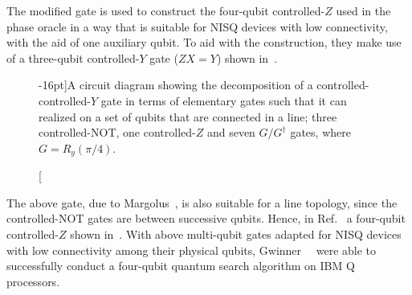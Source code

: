 \noindent
The modified gate is used to construct the four-qubit controlled-$Z$ used in the phase oracle in a way that is suitable for \acs{NISQ} devices with low connectivity, with the aid of one auxiliary qubit. To aid with the construction, they make use of a three-qubit controlled-$Y$ gate ($ZX = Y$) shown in~.


\begin{figure}[h]
    \centering
    \caption[A circuit diagram showing the decomposition of a controlled-controlled-$Y$ gate in terms of elementary gates such that it can realized on a set of qubits that are connected in a line.][-16pt]{A circuit diagram showing the decomposition of a controlled-controlled-$Y$ gate in terms of elementary gates such that it can realized on a set of qubits that are connected in a line; three controlled-NOT, one controlled-$Z$ and seven $G/G^{\dagger}$ gates, where ${G=R_y(\pi/4)}$.}
\end{figure}

\noindent
The above gate, due to Margolus~\cite{Marg_1994}, is also suitable for a line topology, since the controlled-NOT gates are between successive qubits. Hence, in Ref.~\cite{Gwinner_2020} a four-qubit controlled-$Z$ shown in~. With above multi-qubit gates adapted for \acs{NISQ} devices with low connectivity among their physical qubits, Gwinner~\etal~\cite{Gwinner_2020} were able to successfully conduct a four-qubit quantum search algorithm on IBM Q processors. 

